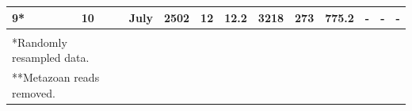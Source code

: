 {\begin{landscape}
\begin{table}[]
\begin{tabular}{@{}lclllllllllll@{}}
9*  &                                  & 10        & July  & 2502         & 12        & 12.2      & 3218         & 273       & 775.2     & -            & -         & -         \\ \midrule
    &                                  &           &       &              &           &           &              &           &           &              &           &           \\
\multicolumn{3}{l}{*Randomly resampled data.}      &       &              &           &           &              &           &           &              &           &           \\
\multicolumn{3}{l}{**Metazoan reads removed.}      &       &              &           &           &              &           &           &              &           &          
\end{tabular}
\end{table}
\end{landscape}
}


